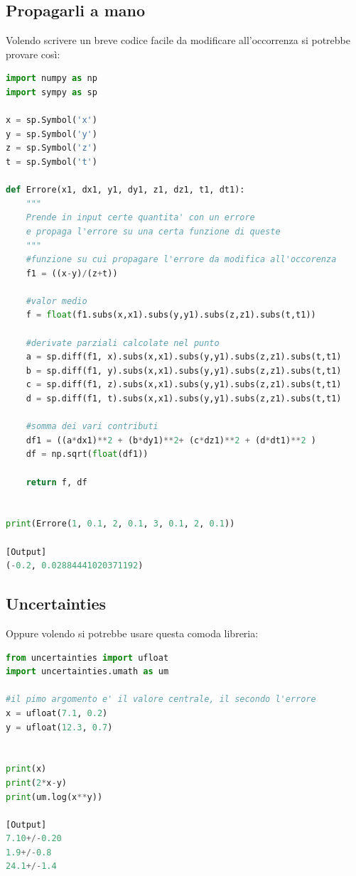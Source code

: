\documentclass[10pt,a4paper]{article}
\begin{document}
\subsection{Propagarli a mano}
Volendo scrivere un breve codice facile da modificare all'occorrenza si potrebbe provare così:
\begin{lstlisting}[language=Python]
import numpy as np
import sympy as sp

x = sp.Symbol('x')
y = sp.Symbol('y')
z = sp.Symbol('z')
t = sp.Symbol('t')

def Errore(x1, dx1, y1, dy1, z1, dz1, t1, dt1):
    """
    Prende in input certe quantita' con un errore
    e propaga l'errore su una certa funzione di queste
    """
    #funzione su cui propagare l'errore da modifica all'occorenza
    f1 = ((x-y)/(z+t))

    #valor medio
    f = float(f1.subs(x,x1).subs(y,y1).subs(z,z1).subs(t,t1))

    #derivate parziali calcolate nel punto
    a = sp.diff(f1, x).subs(x,x1).subs(y,y1).subs(z,z1).subs(t,t1)
    b = sp.diff(f1, y).subs(x,x1).subs(y,y1).subs(z,z1).subs(t,t1)
    c = sp.diff(f1, z).subs(x,x1).subs(y,y1).subs(z,z1).subs(t,t1)
    d = sp.diff(f1, t).subs(x,x1).subs(y,y1).subs(z,z1).subs(t,t1)

    #somma dei vari contributi
    df1 = ((a*dx1)**2 + (b*dy1)**2+ (c*dz1)**2 + (d*dt1)**2 )
    df = np.sqrt(float(df1))

    return f, df


print(Errore(1, 0.1, 2, 0.1, 3, 0.1, 2, 0.1))

[Output]
(-0.2, 0.02884441020371192)
\end{lstlisting}

\subsection{Uncertainties}
Oppure volendo si potrebbe usare questa comoda libreria:

\begin{lstlisting}[language=Python]
from uncertainties import ufloat
import uncertainties.umath as um

#il pimo argomento e' il valore centrale, il secondo l'errore
x = ufloat(7.1, 0.2)
y = ufloat(12.3, 0.7)


print(x)
print(2*x-y)
print(um.log(x**y))

[Output]
7.10+/-0.20
1.9+/-0.8
24.1+/-1.4
\end{lstlisting}
\end{document}
